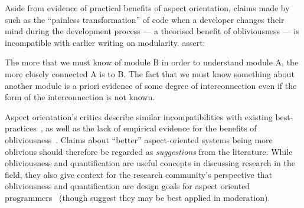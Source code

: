 Aside from evidence of practical benefits of aspect orientation, claims made by
\citeauthor{filman2000aspect} such as the ``painless transformation'' of code
when a developer changes their mind during the development process --- a
theorised benefit of obliviousness --- is incompatible with earlier writing on
modularity. \citet{yourdon1979structured} assert:

\begin{displayquote}
  The more that we must know of module B in order to understand module A, the
  more closely connected A is to B. The fact that we must know something about
  another module is a priori evidence of some degree of interconnection even if
  the form of the interconnection is not known.
\end{displayquote}

Aspect orientation's critics describe similar incompatibilities with existing
best-practices~\cite{przybylek2010wrong,Constantinides04aopconsidered}, as well
as the lack of empirical evidence for the benefits of
obliviousness~\cite{steimann06paradoxical}. Claims about ``better''
aspect-oriented systems being more oblivious should therefore be regarded as
\emph{suggestions} from the literature. While obliviousness and quantification
are useful concepts in discussing research in the field, they also give context
for the research community's perspective that obliviousness and quantification
are design goals for aspect oriented
programmers~\cite{AspectCplusplusDesignImp,kell2008survey,Charfi2006AspectOrientedWL}
(though \citet{leavens2007multiple} suggest they may be best applied in
moderation).


